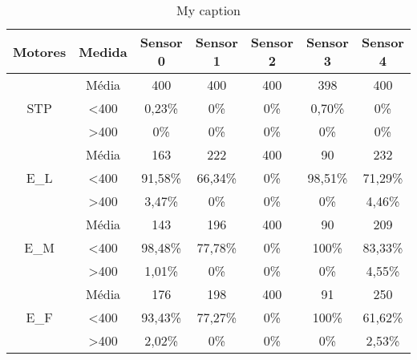 \begin{table}[]
\centering
\caption{My caption}
\label{my-label}
\begin{tabular}{|c|c|ccccc|}
\hline
\textbf{Motores}                & \textbf{Medida}  & \textbf{Sensor 0} & \textbf{Sensor 1} & \textbf{Sensor 2} & \textbf{Sensor 3} & \textbf{Sensor 4} \\ \hline
\multirow{3}{*}{STP}            & Média            & 400               & 400               & 400               & 398               & 400               \\
                                & \textless 400    & 0,23\%            & 0\%            & 0\%            & 0,70\%            & 0\%            \\
                                & \textgreater 400 & 0\%            & 0\%            & 0\%            & 0\%            & 0\%            \\ \hline
\multirow{3}{*}{E\_L}           & Média            & 163               & 222               & 400               & 90                & 232               \\
                                & \textless 400    & 91,58\%           & 66,34\%           & 0\%            & 98,51\%           & 71,29\%           \\
                                & \textgreater 400 & 3,47\%            & 0\%            & 0\%            & 0\%            & 4,46\%            \\ \hline
\multirow{3}{*}{E\_M}           & Média            & 143               & 196               & 400               & 90                & 209               \\
                                & \textless 400    & 98,48\%           & 77,78\%           & 0\%            & 100\%          & 83,33\%           \\
                                & \textgreater 400 & 1,01\%            & 0\%            & 0\%            & 0\%            & 4,55\%            \\ \hline
\multirow{3}{*}{E\_F}           & Média            & 176               & 198               & 400               & 91                & 250               \\
                                & \textless 400    & 93,43\%           & 77,27\%           & 0\%            & 100\%          & 61,62\%           \\
                                & \textgreater 400 & 2,02\%            & 0\%            & 0\%            & 0\%            & 2,53\%            \\ \hline

\end{tabular}
\end{table}

